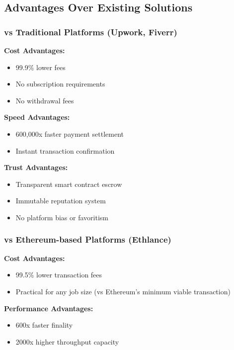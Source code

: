 \documentclass[a4paper,13pt,twoside]{report}
\theoremstyle{definition}
\begin{document}
\subsection{Advantages Over Existing Solutions}

\subsubsection{vs Traditional Platforms (Upwork, Fiverr)}

\textbf{Cost Advantages:}
\begin{itemize}
    \item 99.9\% lower fees
    \item No subscription requirements
    \item No withdrawal fees
\end{itemize}

\textbf{Speed Advantages:}
\begin{itemize}
    \item 600,000x faster payment settlement
    \item Instant transaction confirmation
\end{itemize}

\textbf{Trust Advantages:}
\begin{itemize}
    \item Transparent smart contract escrow
    \item Immutable reputation system
    \item No platform bias or favoritism
\end{itemize}

\subsubsection{vs Ethereum-based Platforms (Ethlance)}

\textbf{Cost Advantages:}
\begin{itemize}
    \item 99.5\% lower transaction fees
    \item Practical for any job size (vs Ethereum's minimum viable transaction)
\end{itemize}

\textbf{Performance Advantages:}
\begin{itemize}
    \item 600x faster finality
    \item 2000x higher throughput capacity
\end{itemize}
\end{document}
